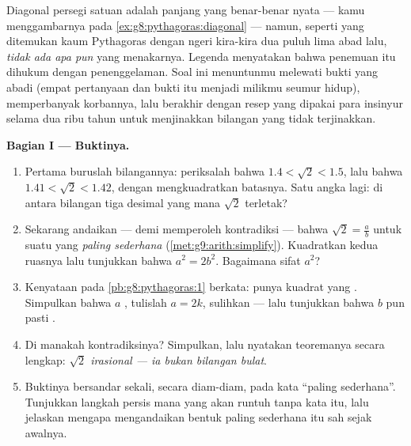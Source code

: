 \begin{problem}
\label{pb:g9:sqrt:1}
Diagonal persegi satuan adalah panjang yang benar-benar nyata ---
kamu menggambarnya pada \cref{ex:g8:pythagoras:diagonal} --- namun,
seperti yang ditemukan kaum Pythagoras dengan ngeri kira-kira dua
puluh lima abad lalu, \emph{tidak ada  apa pun} yang
menakarnya. Legenda menyatakan bahwa penemuan itu dihukum dengan
penenggelaman. Soal ini menuntunmu melewati bukti yang abadi (empat
pertanyaan dan bukti itu menjadi milikmu seumur hidup), memperbanyak
korbannya, lalu berakhir dengan resep yang dipakai para insinyur
selama dua ribu tahun untuk menjinakkan bilangan yang tidak
terjinakkan.

\medskip
\noindent\textbf{Bagian I --- Buktinya.}
\begin{enumerate}
  \item Pertama buruslah bilangannya: periksalah bahwa
        $1.4 < \sqrt2 < 1.5$, lalu bahwa $1.41 < \sqrt2 < 1.42$,
        dengan mengkuadratkan batasnya. Satu angka lagi: di antara
        bilangan tiga desimal yang mana $\sqrt2$ terletak?
  \item Sekarang andaikan --- demi memperoleh kontradiksi --- bahwa
        $\sqrt2 = \frac ab$ untuk suatu  yang \emph{paling
        sederhana} (\cref{met:g9:arith:simplify}). Kuadratkan kedua
        ruasnya lalu tunjukkan bahwa $a^2 = 2 b^2$. Bagaimana sifat
         $a^2$?
  \item Kenyataan  pada \cref{pb:g8:pythagoras:1}
        berkata:  punya kuadrat yang .
        Simpulkan bahwa $a$ , tulislah
        $a = 2k$, sulihkan --- lalu tunjukkan bahwa $b$ pun pasti
        .
  \item Di manakah kontradiksinya? Simpulkan, lalu nyatakan
        teoremanya secara lengkap: \emph{$\sqrt2$ irasional --- ia
        bukan  bilangan bulat}.
  \item Buktinya bersandar sekali, secara diam-diam, pada kata
        ``paling sederhana''. Tunjukkan langkah persis mana yang
        akan runtuh tanpa kata itu, lalu jelaskan mengapa
        mengandaikan bentuk paling sederhana itu sah sejak awalnya.
\end{enumerate}


\end{problem}

